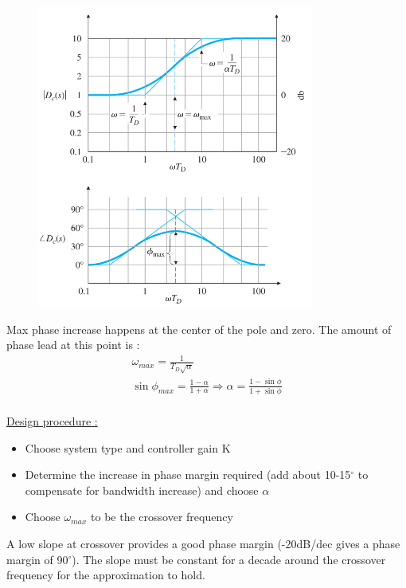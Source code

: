 \documentclass[../main.tex]{subfiles}
\begin{document}
\begin{figure}[hbt!]
    \centering
    \includegraphics[width=.5\textwidth]{IMAGES/control/leadcomp.png}
\end{figure}

Max phase increase happens at the center of the pole and zero. The amount of phase lead at this point is : \begin{equation}
    \begin{gathered}
        \omega_{max} = \frac{1}{T_D \sqrt{\alpha}}\\
        \sin \phi_{max} = \frac{1-\alpha}{1+\alpha} \Rightarrow \alpha = \frac{1-\sin \phi}{1+\sin \phi}\\
    \end{gathered}
\end{equation}

\quad \underline{Design procedure :}\\
\begin{itemize}
    \item Choose system type and controller gain K\\
    \item Determine the increase in phase margin required (add about 10-15$^\circ$ to compensate for bandwidth increase) and choose $\alpha$\\
    \item Choose $\omega_{max}$ to be the crossover frequency\\
\end{itemize}

A low slope at crossover provides a good phase margin (-20dB/dec gives a phase margin of 90$^\circ$). The slope must be constant for a decade around the crossover frequency for the approximation to hold.\\
\end{document}
